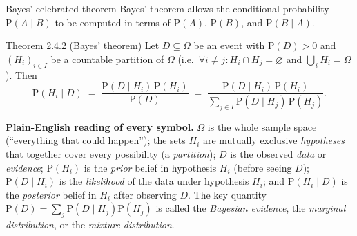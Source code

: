 \documentclass[aspectratio=169,10pt]{beamer}
\begin{document}
\begin{frame}{Bayes' celebrated theorem}
  Bayes' theorem allows the conditional probability $\mathrm P(A\mid B)$ to
  be computed in terms of $\mathrm P(A)$, $\mathrm P(B)$, and
  $\mathrm P(B\mid A)$.

  \begin{block}{Theorem 2.4.2 (Bayes' theorem)}
    Let $D\subseteq\Omega$ be an event with $\mathrm P(D)>0$ and
    $(H_i)_{i\in I}$ be a countable partition of $\Omega$ (i.e.\
    $\forall i\ne j: H_i\cap H_j=\varnothing$ and
    $\dot\bigcup_i H_i=\Omega$). Then
    \[
      \mathrm P(H_i\mid D) \;=\; \frac{\mathrm P(D\mid H_i)\,\mathrm P(H_i)}{\mathrm P(D)}
      \;=\; \frac{\mathrm P(D\mid H_i)\,\mathrm P(H_i)}{\sum_{j\in I}\mathrm P(D\mid H_j)\,\mathrm P(H_j)}.
    \]
  \end{block}

  \textbf{Plain-English reading of every symbol.} $\Omega$ is the whole
  sample space (``everything that could happen''); the sets $H_i$ are
  mutually exclusive \emph{hypotheses} that together cover every
  possibility (a \emph{partition}); $D$ is the observed \emph{data} or
  \emph{evidence}; $\mathrm P(H_i)$ is the \emph{prior} belief in hypothesis
  $H_i$ (before seeing $D$); $\mathrm P(D\mid H_i)$ is the \emph{likelihood}
  of the data under hypothesis $H_i$; and $\mathrm P(H_i\mid D)$ is the
  \emph{posterior} belief in $H_i$ after observing $D$. The key quantity
  $\mathrm P(D)=\sum_{j}\mathrm P(D\mid H_j)\mathrm P(H_j)$ is called the
  \emph{Bayesian evidence}, the \emph{marginal distribution}, or the
  \emph{mixture distribution}.
\end{frame}
\end{document}
